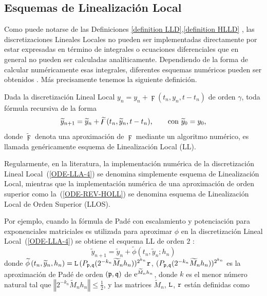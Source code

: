\subsection{Esquemas de Linealización Local}

Como puede notarse de las Definiciones \ref{definition LLD},\ref{definition HLLD} , las
discretizaciones Lineales Locales no pueden ser implementadas directamente por
estar expresadas en término de integrales o ecuaciones diferenciales que en general no pueden ser
calculadas analíticamente. Dependiendo de la forma de calcular  numéricamente esas integrales,
 diferentes esquemas numéricos pueden ser obtenidos \cite{Jimenez05AMC,Jimenez13}.
 Más precisamente tenemos la siguiente definición.
\begin{definition}
	\label{definition LLS} Dada la discretización Lineal Local 
	  $y_n=y_{n}+\digamma(t_{n},y_{n},t-t_{n})$
	 de orden $\gamma $, toda fórmula recursiva de la forma 
	\begin{equation*}
	 \widetilde{y}_{n+1}=\widetilde{y}_{n}+\widetilde{\digamma}(t_{n},\widetilde{y}_{n},t-t_{n})
	 , \text{ \ \ \ \
		\ con }\widetilde{y}_{0}=y_{0},
	\end{equation*}%
	donde $\widetilde{\digamma}$ denota una aproximación
	de $\digamma$ mediante un algoritmo numérico, es
	llamada genéricamente esquema de Linealización Local (LL).
\end{definition}
Regularmente, en la literatura, la implementación numérica de la discretización Lineal Local~(\ref{ODE-LLA-4}) se denomina simplemente esquema de Linealización Local, mientras que la implementación numérica de una aproximación de orden superior como la~(\ref{ODE-REV-HOLL}) se denomina esquema de Linealización Local de Orden Superior (LLOS).

Por ejemplo, cuando la fórmula de Padé con escalamiento y potenciación para exponenciales matriciales \cite{moler2003nineteen} es utilizada para
aproximar $\phi$ en la discretización Lineal Local~(\ref{ODE-LLA-4}) se obtiene el esquema LL de orden $2$ \cite{Jimenez02AMC}:
\begin{equation} 
\widetilde{y}_{n+1}=\widetilde{y}_{n}+\widetilde{\phi}\left( t_{n},\widetilde{y}_{n};h_{n}\right) \label{LL-scheme}
\end{equation} 
donde $\widetilde{\phi }\left( t_{n},\widetilde{y}
_{n},h_{n}\right) =\mathtt{L}\,(P_{\mathfrak{p},\mathfrak{q}}(2^{-k_{n}}\widetilde{M}_{n}h_{n}))^{2^{k_{n}}}\mathtt{r}$, 
$(P_{\mathfrak{p},\mathfrak{q}}(2^{-k_{n}}\widetilde{M}_{n}h_{n}))^{2^{k_{n}}}$ es la aproximación
de Padé de orden $(\mathfrak{p},\mathfrak{q})$ de  $\mathrm{e}^{\widetilde{M}_{n}h_{n}}$, donde
$k$ es el menor número natural tal que $\left\Vert 2^{-k_{n}}\widetilde{M}_{n}h_{n}\right\Vert \leq \frac{1}{2}$, 
y las matrices $\widetilde{M}_{n}$, $\mathtt{L}$, $\mathtt{r}$ están definidas como

